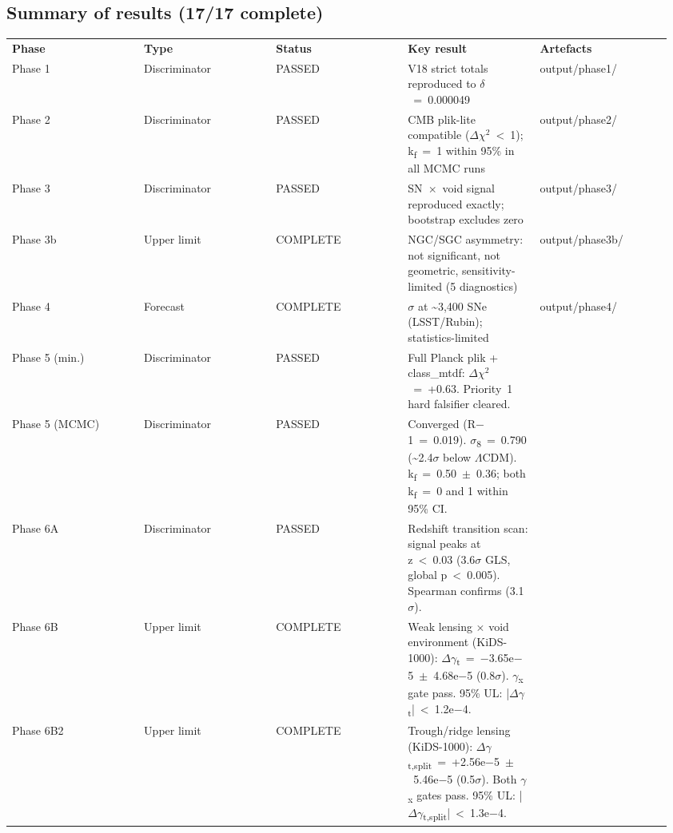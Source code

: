 \documentclass[11pt,a4paper]{article}
\begin{document}
\subsection{Summary of results (17/\allowbreak{}17 complete)}
\begingroup\footnotesize
\begin{longtable}{>{\RaggedRight\arraybackslash}p{0.192\linewidth}>{\RaggedRight\arraybackslash}p{0.192\linewidth}>{\RaggedRight\arraybackslash}p{0.192\linewidth}>{\RaggedRight\arraybackslash}p{0.192\linewidth}>{\RaggedRight\arraybackslash}p{0.192\linewidth}}
\toprule
\endfirsthead
\toprule\endhead
\bottomrule\endfoot
\textbf{Phase} & \textbf{Type} & \textbf{Status} & \textbf{Key result} & \textbf{Artefacts} \tabularnewline
Phase 1 & Discriminator & PASSED & V18 strict totals reproduced to $\delta$~=~0.000049 & output/\allowbreak{}phase1/\allowbreak{} \tabularnewline
Phase 2 & Discriminator & PASSED & CMB plik-lite compatible ($\Delta$$\chi$$^{2}$~<~1); k\textsubscript{f}~=~1 within 95\% in all MCMC runs & output/\allowbreak{}phase2/\allowbreak{} \tabularnewline
Phase 3 & Discriminator & PASSED & SN~$\times$~void signal reproduced exactly; bootstrap excludes zero & output/\allowbreak{}phase3/\allowbreak{} \tabularnewline
Phase 3b & Upper limit & COMPLETE & NGC/\allowbreak{}SGC asymmetry: not significant, not geometric, sensitivity-limited (5 diagnostics) & output/\allowbreak{}phase3b/\allowbreak{} \tabularnewline
Phase 4 & Forecast & COMPLETE & 5$\sigma$ at \~{}3,400 SNe (LSST/\allowbreak{}Rubin); statistics-limited & output/\allowbreak{}phase4/\allowbreak{} \tabularnewline
Phase 5 (min.) & Discriminator & PASSED & Full Planck plik + class\_\allowbreak{}mtdf: $\Delta$$\chi$$^{2}$~=~+0.63. Priority~1 hard falsifier cleared. & \multirow{2}{*}{output/\allowbreak{}phase5/\allowbreak{}} \tabularnewline
Phase 5 (MCMC) & Discriminator & PASSED & Converged (R$-$1~=~0.019). $\sigma$\textsubscript{8}~=~0.790 (\~{}2.4$\sigma$ below $\Lambda$CDM). k\textsubscript{f}~=~0.50~$\pm$~0.36; both k\textsubscript{f}~=~0 and 1 within 95\% CI. &  \tabularnewline
Phase 6A & Discriminator & PASSED & Redshift transition scan: signal peaks at z~<~0.03 (3.6$\sigma$ GLS, global p~<~0.005). Spearman confirms (3.1$\sigma$). & \multirow{10}{*}{output/\allowbreak{}phase6/\allowbreak{}} \tabularnewline
Phase 6B & Upper limit & COMPLETE & Weak lensing $\times$ void environment (KiDS-1000): $\Delta$$\gamma$\textsubscript{t}~=~$-$3.65e$-$5~$\pm$~4.68e$-$5 (0.8$\sigma$). $\gamma$\textsubscript{x} gate pass. 95\% UL: |$\Delta$$\gamma$\textsubscript{t}|~<~1.2e$-$4. &  \tabularnewline
Phase 6B2 & Upper limit & COMPLETE & Trough/\allowbreak{}ridge lensing (KiDS-1000): $\Delta$$\gamma$\textsubscript{t,split}~=~+2.56e$-$5~$\pm$~5.46e$-$5 (0.5$\sigma$). Both $\gamma$\textsubscript{x} gates pass. 95\% UL: |$\Delta$$\gamma$\textsubscript{t,split}|~<~1.3e$-$4. &  \tabularnewline

\end{longtable}
\end{document}
